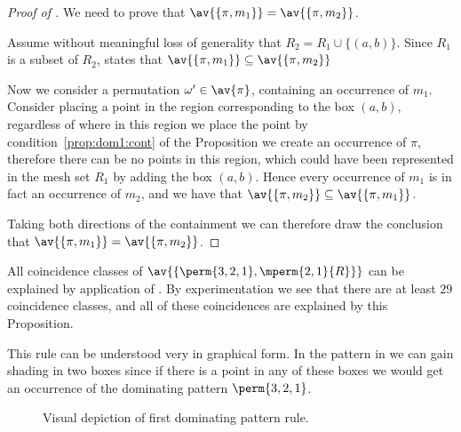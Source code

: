 \begin{proof}[Proof of ]
    We need to prove that \(\av{\{\pi,m_1\}} = \av{\{\pi,m_2\}}\).

    \noindent Assume without meaningful loss of generality that \(R_2 = R_1 \cup \{(a,b)\}\).
    Since \(R_1\) is a subset of \(R_2\),  states that
    \(\av{\{\pi,m_1\}} \subseteq \av{\{\pi,m_2\}}\)

    Now we consider a permutation \(\omega^\prime\in \av{\pi}\),
    containing an occurrence of \(m_1\). Consider placing a point in the
    region corresponding to the box \((a,b)\), regardless of where in this
    region we place the point by condition~\ref{prop:dom1:cont} of the
    Proposition we create an occurrence of \(\pi\), therefore there can be no
    points in this region, which could have been represented in the mesh set
    \(R_1\) by adding the box \((a,b)\). Hence every occurrence of
    \(m_1\) is in fact an occurrence of \(m_2\), and we have that
    \(\av{\{\pi,m_2\}} \subseteq \av{\{\pi,m_1\}}\).

    Taking both directions of the containment we can therefore draw the
    conclusion that \(\av{\{\pi,m_1\}} = \av{\{\pi,m_2\}}\).
\end{proof}

All coincidence classes of \(\av{\{\perm{3,2,1}, \mperm{2,1}{R}\}}\) can be
explained by application of . By experimentation
we see that there are at least \(29\) coincidence classes, and all of these
coincidences are explained by this Proposition.

This rule can be understood very in graphical form. In the
pattern in  we can gain shading in two boxes since if
there is a point in any of these boxes we would get an occurrence of the
dominating pattern \(\perm{3,2,1}\).

\begin{figure}[htb]
    \begin{center}
        \raisebox{2ex}{\(\mapsto\)}

        \caption{Visual depiction of first dominating pattern rule.}
        \label{fig:rule1}
    \end{center}
\end{figure}

